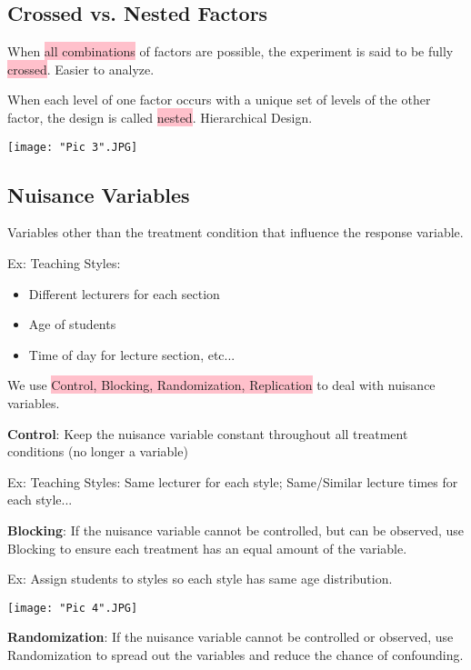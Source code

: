 \documentclass[a4paper,11pt]{article}
\begin{document}
\subsection{Crossed vs. Nested Factors}
When \colorbox{pink}{all combinations} of factors are possible, the experiment is said to be fully \colorbox{pink}{crossed}. Easier to analyze. 

When each level of one factor occurs with a unique set of levels of the other factor, the design is called \colorbox{pink}{nested}. Hierarchical Design. 

\begin{center}
	\texttt{[image: "Pic 3".JPG]}
\end{center}

\subsection{Nuisance Variables}
Variables other than the treatment condition that influence the response variable. 

Ex: Teaching Styles: 
\begin{itemize}
\item Different lecturers for each section
\item Age of students
\item Time of day for lecture section, etc...
\end{itemize}

We use \colorbox{pink}{Control, Blocking, Randomization, Replication} to deal with nuisance variables. 

\textbf{Control}: Keep the nuisance variable constant throughout all treatment conditions (no longer a variable)

Ex: Teaching Styles: Same lecturer for each style; Same/Similar lecture times for each style...

\textbf{Blocking}: If the nuisance variable cannot be controlled, but can be observed, use Blocking to ensure each treatment has an equal amount of the variable. 

Ex: Assign students to styles so each style has same age distribution. 
\begin{center}
	\texttt{[image: "Pic 4".JPG]}
\end{center}

\textbf{Randomization}: If the nuisance variable cannot be controlled or observed, use Randomization to spread out the variables and reduce the chance of confounding. 
\end{document}
